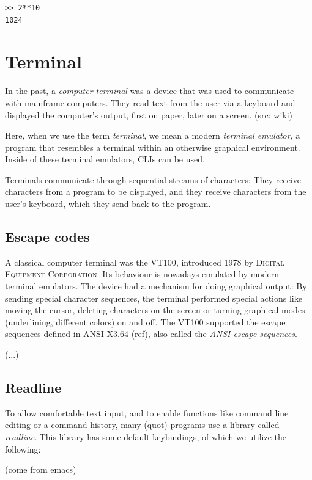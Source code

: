 \documentclass[a4paper,twoside,abstract=on,cleardoublepage=empty,numbers=noenddot,toc=bib]{scrreprt}
\begin{document}
\begin{lstlisting}
>> 2**10
1024
\end{lstlisting}

\section{Terminal}

In the past, a \emph{computer terminal} was a device that was used to communicate with mainframe computers. They read text from the user via a keyboard and displayed the computer's output, first on paper, later on a screen. (src: wiki)

Here, when we use the term \emph{terminal}, we mean a modern \emph{terminal emulator}, a program that resembles a terminal within an otherwise graphical environment. Inside of these terminal emulators, \textsc{CLI}s can be used.

Terminals communicate through sequential streams of characters: They receive characters from a program to be displayed, and they receive characters from the user's keyboard, which they send back to the program.

\subsection{Escape codes}

A classical computer terminal was the \textsc{VT100}, introduced 1978 by \textsc{Digital Equipment Corporation}. Its behaviour is nowadays emulated by modern terminal emulators. The device had a mechanism for doing graphical output: By sending special character sequences, the terminal performed special actions like moving the cursor, deleting characters on the screen or turning graphical modes (underlining, different colors) on and off. The \textsc{VT100} supported the escape sequences defined in ANSI X3.64 (ref), also called the \emph{ANSI escape sequences}.

(...)

\subsection{Readline}

To allow comfortable text input, and to enable functions like command line editing or a command history, many (quot) programs use a library called \emph{readline}. This library has some default keybindings, of which we utilize the following:

(come from emacs)
\end{document}
